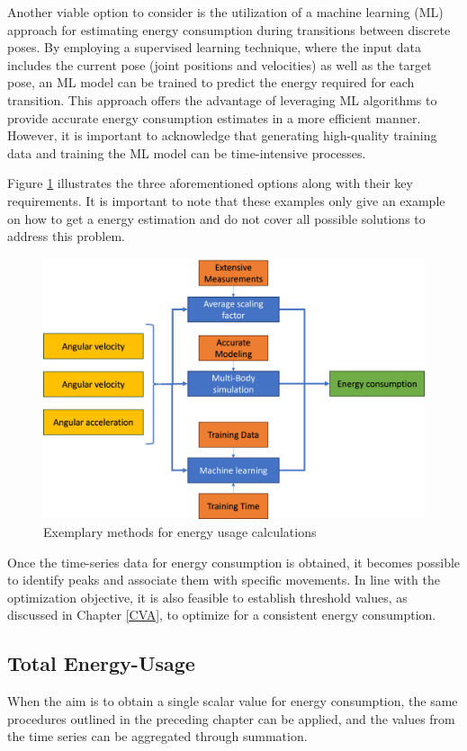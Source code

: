 Another viable option to consider is the utilization of a machine learning (ML) approach for estimating energy consumption during transitions between discrete poses. By employing a supervised learning technique, where the input data includes the current pose (joint positions and velocities) as well as the target pose, an ML model can be trained to predict the energy required for each transition. This approach offers the advantage of leveraging ML algorithms to provide accurate energy consumption estimates in a more efficient manner. However, it is important to acknowledge that generating high-quality training data and training the ML model can be time-intensive processes.

Figure \ref{ENERGYOPTIONS} illustrates the three aforementioned options along with their key requirements. It is important to note that these examples only give an example on how to get a energy estimation and do not cover all possible solutions to address this problem. 

\begin{figure}[H]
	\centerline{\includegraphics[width=.8\textwidth]{figures/ENERGYOPTIONS.png}}
	\caption{Exemplary methods for energy usage calculations}
	\label{ENERGYOPTIONS}
\end{figure}

Once the time-series data for energy consumption is obtained, it becomes possible to identify peaks and associate them with specific movements. In line with the optimization objective, it is also feasible to establish threshold values, as discussed in Chapter \ref{CVA}, to optimize for a consistent energy consumption.


\subsection{Total Energy-Usage}
When the aim is to obtain a single scalar value for energy consumption, the same procedures outlined in the preceding chapter can be applied, and the values from the time series can be aggregated through summation.

